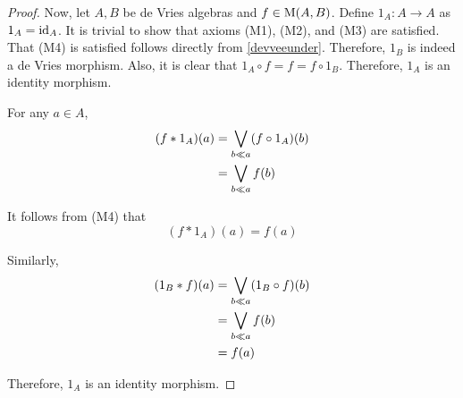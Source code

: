 \begin{proof}
	Now, let \( A,B \) be de Vries algebras and \( f \in \operatorname{M}(A,B) \).  Define \( 1_A: A \to A \) as \( 1_A = \operatorname{id}_A \).  It is trivial to show that axioms (M1), (M2), and (M3) are satisfied.  That (M4) is satisfied follows directly from \ref{devveeunder}.  Therefore, \( 1_B \) is indeed a de Vries morphism.  Also, it is clear that \( 1_A \circ f = f = f \circ 1_B \).  Therefore, \( 1_A \) is an identity morphism.	
	
	For any \( a \in A \),
	\begin{align*}
		(f \ast 1_A)(a) &= \bigvee_{b \ll a} (f \circ 1_A)(b) \\
		&= \bigvee_{b \ll a} f(b)
	\end{align*}
	
	It follows from (M4) that
	\[ (f \ast 1_A)(a) = f(a) \]
	
	Similarly,
	\begin{align*}
		(1_B \ast f)(a) &= \bigvee_{b \ll a} (1_B \circ f)(b) \\
		&= \bigvee_{b \ll a} f(b) \\
		&= f(a)
	\end{align*}
		
	Therefore, \( 1_A \) is an identity morphism.
\end{proof}

